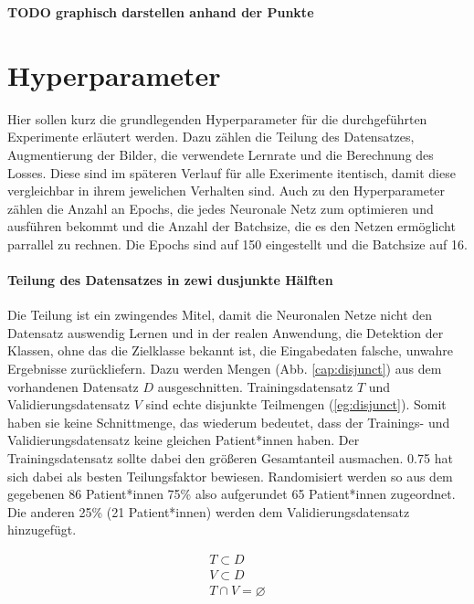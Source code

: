 \textbf{TODO graphisch darstellen anhand der Punkte}


\clearpage
\section{Hyperparameter}\label{hyper}
Hier sollen kurz die grundlegenden Hyperparameter für die durchgeführten Experimente erläutert werden. Dazu zählen die Teilung des Datensatzes, Augmentierung der Bilder, die verwendete Lernrate und die Berechnung des Losses. Diese sind im späteren Verlauf für alle Exerimente itentisch, damit diese vergleichbar in ihrem jewelichen Verhalten sind. Auch zu den Hyperparameter zählen die Anzahl an Epochs, die jedes Neuronale Netz zum optimieren und ausführen bekommt und die Anzahl der Batchsize, die es den Netzen ermöglicht parrallel zu rechnen. Die Epochs sind auf 150 eingestellt und die Batchsize auf 16.

\paragraph{Teilung des Datensatzes in zewi dusjunkte Hälften} Die Teilung ist ein zwingendes Mitel, damit die Neuronalen Netze nicht den Datensatz auswendig Lernen und in der realen Anwendung, die Detektion der Klassen, ohne das die Zielklasse bekannt ist, die Eingabedaten falsche, unwahre Ergebnisse zurückliefern. Dazu werden Mengen (Abb. \ref{cap:disjunct}) aus dem vorhandenen Datensatz $D$ ausgeschnitten. Trainingsdatensatz $T$ und Validierungsdatensatz $V$ sind echte disjunkte Teilmengen (\ref{eg:disjunct}). Somit haben sie keine Schnittmenge, das wiederum bedeutet, dass der Trainings- und Validierungsdatensatz keine gleichen Patient*innen haben. Der Trainingsdatensatz sollte dabei den größeren Gesamtanteil ausmachen. 0.75 hat sich  dabei als besten Teilungsfaktor bewiesen. Randomisiert werden so aus dem gegebenen 86 Patient*innen 75\% also aufgerundet 65 Patient*innen zugeordnet. Die anderen 25\% (21 Patient*innen) werden dem Validierungsdatensatz hinzugefügt.

\begin{equation}
\begin{split}
  T \subset D \\
  V \subset D \\
  T \cap V  = \varnothing
\end{split}
\label{eg:disjunct}
\end{equation}


